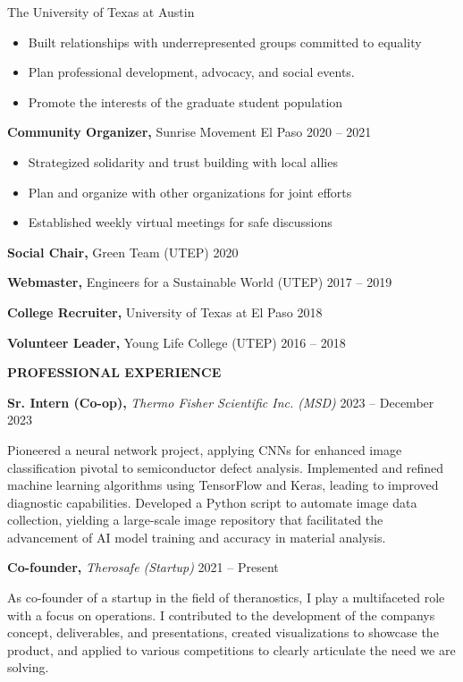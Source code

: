 \documentclass[
]{article}
\begin{document}
The University of Texas at Austin

\begin{itemize}
\item
  Built relationships with underrepresented groups committed to equality
\item
  Plan professional development, advocacy, and social events.
\item
  Promote the interests of the graduate student population
\end{itemize}

\textbf{Community Organizer,} Sunrise Movement El Paso 2020 -- 2021

\begin{itemize}
\item
  Strategized solidarity and trust building with local allies
\item
  Plan and organize with other organizations for joint efforts
\item
  Established weekly virtual meetings for safe discussions
\end{itemize}

\textbf{Social Chair,} Green Team (UTEP) 2020

\textbf{Webmaster,} Engineers for a Sustainable World (UTEP) 2017 -- 2019

\textbf{College Recruiter,} University of Texas at El Paso 2018

\textbf{Volunteer Leader,} Young Life College (UTEP) 2016 -- 2018

\textbf{PROFESSIONAL EXPERIENCE}

\textbf{Sr. Intern (Co-op),} \emph{Thermo Fisher Scientific Inc. (MSD)} 2023 -- December 2023

Pioneered a neural network project, applying CNNs for enhanced image classification pivotal to semiconductor defect analysis. Implemented and refined machine learning algorithms using TensorFlow and Keras, leading to improved diagnostic capabilities. Developed a Python script to automate image data collection, yielding a large-scale image repository that facilitated the advancement of AI model training and accuracy in material analysis.

\textbf{Co-founder,} \emph{Therosafe (Startup)} 2021 -- Present

As co-founder of a startup in the field of theranostics, I play a multifaceted role with a focus on operations. I contributed to the development of the company\textquotesingle s concept, deliverables, and presentations, created visualizations to showcase the product, and applied to various competitions to clearly articulate the need we are solving.
\end{document}
